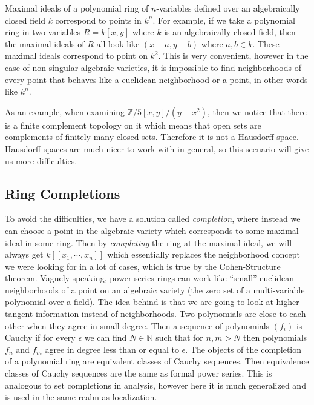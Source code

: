 \documentclass[11pt]{article}
\begin{document}
Maximal ideals of a polynomial ring of \(n\)-variables defined over an
algebraically closed field \(k\) correspond to points in \(k^n\). For
example, if we take a polynomial ring in two variables \(R=k[x,y]\)
where \(k\) is an algebraically closed field, then the maximal ideals of
\(R\) all look like \((x-a,y-b)\) where \(a,b \in k\). These maximal
ideals correspond to point on \(k^2\). This is very convenient, however
in the case of non-singular algebraic varieties, it is impossible to find
neighborhoods of every point that behaves like a euclidean neighborhood
or a point, in other words like \(k^n\).

As an example, when examining \(\mathbb{Z}/5[x,y]/(y-x^2)\), then we
notice that there is a finite complement topology on it which means that
open sets are complements of finitely many closed sets. Therefore it is
not a Hausdorff space. Hausdorff spaces are much nicer to work with in
general, so this scenario will give us more difficulties.

\hypertarget{ring-completions}{%
\subsection{Ring Completions}\label{ring-completions}}

To avoid the difficulties, we have a solution called \emph{completion},
where instead we can choose a point in the algebraic variety which
corresponds to some maximal ideal in some ring. Then by
\emph{completing} the ring at the maximal ideal, we will always get
\(k[[x_1,\cdots,x_n]]\) which essentially replaces the neighborhood
concept we were looking for in a lot of cases, which is true by the
Cohen-Structure theorem. Vaguely speaking, power series rings can work
like ``small'' euclidean neighborhoods of a point on an algebraic
variety (the zero set of a multi-variable polynomial over a field).\cite{atiyah1994introduction} The
idea behind is that we are going to look at higher tangent information
instead of neighborhoods. Two polynomials are close to each other when
they agree in small degree. Then a sequence of polynomials \((f_i)\) is
Cauchy if for every \(\epsilon\) we can find \(N\in \mathbb{N}\) such
that for \(n,m > N\) then polynomials \(f_{n}\) and \(f_{m}\) agree in
degree less than or equal to \(\epsilon\). The objects of the completion
of a polynomial ring are equivalent classes of Cauchy sequences. Then
equivalence classes of Cauchy sequences are the same as formal power
series. This is analogous to set completions in analysis, however here
it is much generalized and is used in the same realm as localization.
\end{document}

